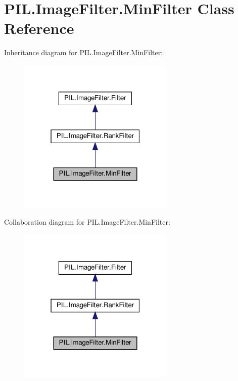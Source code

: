 \hypertarget{classPIL_1_1ImageFilter_1_1MinFilter}{}\section{P\+I\+L.\+Image\+Filter.\+Min\+Filter Class Reference}
\label{classPIL_1_1ImageFilter_1_1MinFilter}


Inheritance diagram for P\+I\+L.\+Image\+Filter.\+Min\+Filter\+:
\nopagebreak
\begin{figure}[H]
\begin{center}
\leavevmode
\includegraphics[width=211pt]{classPIL_1_1ImageFilter_1_1MinFilter__inherit__graph}
\end{center}
\end{figure}


Collaboration diagram for P\+I\+L.\+Image\+Filter.\+Min\+Filter\+:
\nopagebreak
\begin{figure}[H]
\begin{center}
\leavevmode
\includegraphics[width=211pt]{classPIL_1_1ImageFilter_1_1MinFilter__coll__graph}
\end{center}
\end{figure}
